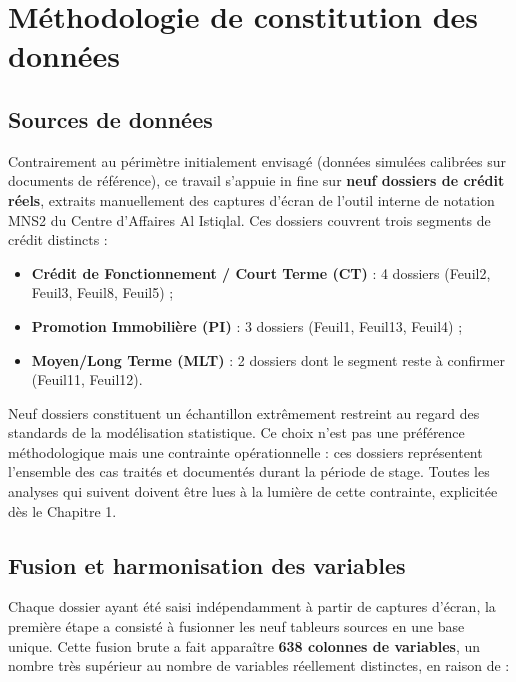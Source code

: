 \chapter{Méthodologie de constitution des données}

\section{Sources de données}

Contrairement au périmètre initialement envisagé (données simulées calibrées sur documents
de référence), ce travail s'appuie in fine sur \textbf{neuf dossiers de crédit réels}, extraits
manuellement des captures d'écran de l'outil interne de notation MNS2 du Centre d'Affaires
Al Istiqlal. Ces dossiers couvrent trois segments de crédit distincts :

\begin{itemize}
    \item \textbf{Crédit de Fonctionnement / Court Terme (CT)} : 4 dossiers (Feuil2, Feuil3, Feuil8, Feuil5) ;
    \item \textbf{Promotion Immobilière (PI)} : 3 dossiers (Feuil1, Feuil13, Feuil4) ;
    \item \textbf{Moyen/Long Terme (MLT)} : 2 dossiers dont le segment reste à confirmer (Feuil11, Feuil12).
\end{itemize}

\begin{limite}
Neuf dossiers constituent un échantillon extrêmement restreint au regard des standards de la
modélisation statistique. Ce choix n'est pas une préférence méthodologique mais une contrainte
opérationnelle : ces dossiers représentent l'ensemble des cas traités et documentés durant la
période de stage. Toutes les analyses qui suivent doivent être lues à la lumière de cette
contrainte, explicitée dès le Chapitre 1.
\end{limite}

\section{Fusion et harmonisation des variables}

Chaque dossier ayant été saisi indépendamment à partir de captures d'écran, la première étape
a consisté à fusionner les neuf tableurs sources en une base unique. Cette fusion brute a fait
apparaître \textbf{638 colonnes de variables}, un nombre très supérieur au nombre de variables
réellement distinctes, en raison de :

